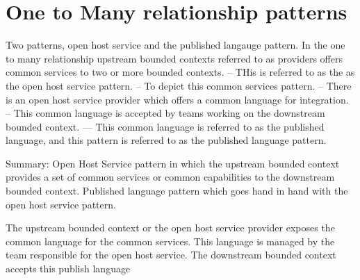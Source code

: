 \section{One to Many relationship patterns}

Two patterns, open host service and the published langauge pattern.
In the one to many relationship upstream bounded contexts referred to as providers offers common services to two or more bounded contexts.
-- THis is referred to as the as the open host service pattern.
-- To depict this common services pattern.
-- There is an open host service provider which offers a common language for integration.
-- This common language is accepted by teams working on the downstream bounded context.
--- This common language is referred to as the published language, and this pattern is referred to as the published language pattern.

Summary:
Open Host Service pattern in which the upstream bounded context provides a set of common services or common capabilities to the downstream bounded context.
Published language pattern which goes hand in hand with the open host service pattern.

The upstream bounded context or the open host service provider exposes the common language for the common services.
This language is managed by the team responsible for the open host service.
The downstream bounded context accepts this publish language


